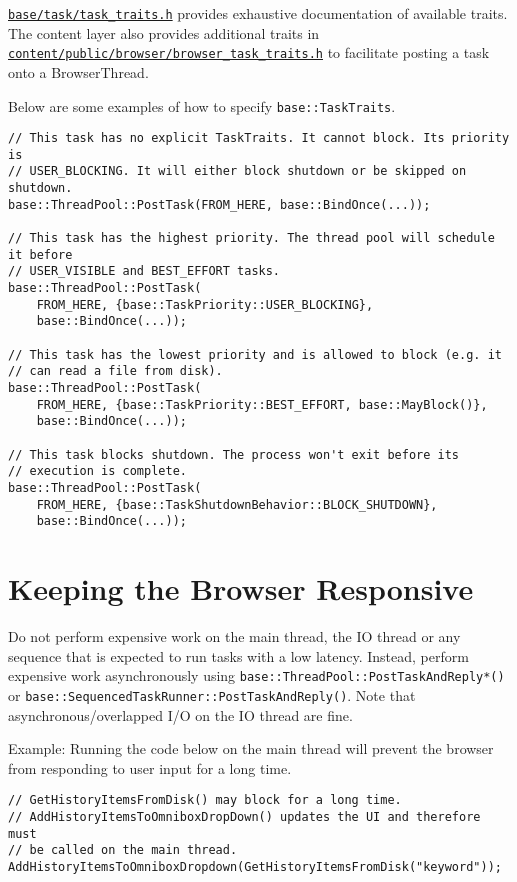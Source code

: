 \documentclass[a4paper,12pt,notitlepage,twoside,openright]{article}
\begin{document}
\href{https://cs.chromium.org/chromium/src/base/task/task_traits.h}{\texttt{base/task/task\_traits.h}}
provides exhaustive documentation of available traits. The content layer
also provides additional traits in
\href{https://cs.chromium.org/chromium/src/content/public/browser/browser_task_traits.h}{\texttt{content/public/browser/browser\_task\_traits.h}}
to facilitate posting a task onto a BrowserThread.

Below are some examples of how to specify \texttt{base::TaskTraits}.

\begin{verbatim}
// This task has no explicit TaskTraits. It cannot block. Its priority is
// USER_BLOCKING. It will either block shutdown or be skipped on shutdown.
base::ThreadPool::PostTask(FROM_HERE, base::BindOnce(...));

// This task has the highest priority. The thread pool will schedule it before
// USER_VISIBLE and BEST_EFFORT tasks.
base::ThreadPool::PostTask(
    FROM_HERE, {base::TaskPriority::USER_BLOCKING},
    base::BindOnce(...));

// This task has the lowest priority and is allowed to block (e.g. it
// can read a file from disk).
base::ThreadPool::PostTask(
    FROM_HERE, {base::TaskPriority::BEST_EFFORT, base::MayBlock()},
    base::BindOnce(...));

// This task blocks shutdown. The process won't exit before its
// execution is complete.
base::ThreadPool::PostTask(
    FROM_HERE, {base::TaskShutdownBehavior::BLOCK_SHUTDOWN},
    base::BindOnce(...));
\end{verbatim}

\hypertarget{keeping-the-browser-responsive}{%
\section{Keeping the Browser
Responsive}\label{keeping-the-browser-responsive}}

Do not perform expensive work on the main thread, the IO thread or any
sequence that is expected to run tasks with a low latency. Instead,
perform expensive work asynchronously using
\texttt{base::ThreadPool::PostTaskAndReply*()} or
\texttt{base::SequencedTaskRunner::PostTaskAndReply()}. Note that
asynchronous/overlapped I/O on the IO thread are fine.

Example: Running the code below on the main thread will prevent the
browser from responding to user input for a long time.

\begin{verbatim}
// GetHistoryItemsFromDisk() may block for a long time.
// AddHistoryItemsToOmniboxDropDown() updates the UI and therefore must
// be called on the main thread.
AddHistoryItemsToOmniboxDropdown(GetHistoryItemsFromDisk("keyword"));
\end{verbatim}
\end{document}
